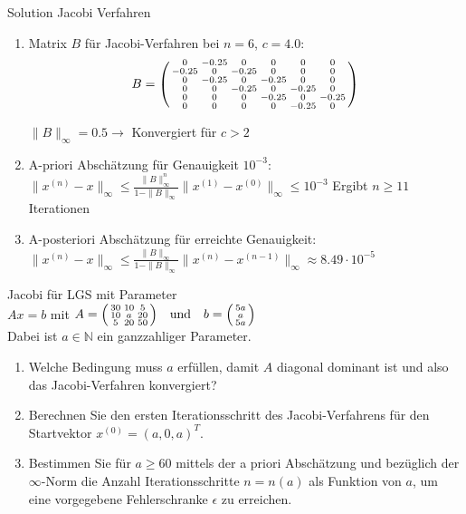 \begin{KR}{Solution Jacobi Verfahren}
\begin{enumerate}
    \item Matrix $B$ für Jacobi-Verfahren bei $n=6$, $c=4.0$:
    $$B = \begin{psmallmatrix}
    0 & -0.25 & 0 & 0 & 0 & 0\\
    -0.25 & 0 & -0.25 & 0 & 0 & 0\\
    0 & -0.25 & 0 & -0.25 & 0 & 0\\
    0 & 0 & -0.25 & 0 & -0.25 & 0\\
    0 & 0 & 0 & -0.25 & 0 & -0.25\\
    0 & 0 & 0 & 0 & -0.25 & 0
    \end{psmallmatrix}$$
    
    $\|B\|_\infty = 0.5 \rightarrow$
    Konvergiert für $c > 2$
    
    \item A-priori Abschätzung für Genauigkeit $10^{-3}$:\\
    $\|x^{(n)} - x\|_\infty \leq \frac{\|B\|_\infty^n}{1-\|B\|_\infty}\|x^{(1)}-x^{(0)}\|_\infty \leq 10^{-3}$
    Ergibt $n \geq 11$ Iterationen
    
    \item A-posteriori Abschätzung für erreichte Genauigkeit:\\
    $\|x^{(n)} - x\|_\infty \leq \frac{\|B\|_\infty}{1-\|B\|_\infty}\|x^{(n)}-x^{(n-1)}\|_\infty \approx 8.49 \cdot 10^{-5}$
\end{enumerate}
\end{KR}

\begin{example2}{Jacobi für LGS mit Parameter}\\
$Ax = b$ mit
$A = \begin{psmallmatrix}
30 & 10 & 5\\
10 & a & 20\\
5 & 20 & 50
\end{psmallmatrix}
\quad \text{und} \quad
b = \begin{psmallmatrix}
5a\\
a\\
5a
\end{psmallmatrix}$\\
Dabei ist $a \in \mathbb{N}$ ein ganzzahliger Parameter.
\begin{enumerate}
    \item Welche Bedingung muss $a$ erfüllen, damit $A$ diagonal dominant ist und also das Jacobi-Verfahren konvergiert?
    
    \item Berechnen Sie den ersten Iterationsschritt des Jacobi-Verfahrens für den Startvektor $x^{(0)} = (a,0,a)^T$.
    
    \item Bestimmen Sie für $a \geq 60$ mittels der a priori Abschätzung und bezüglich der $\infty$-Norm die Anzahl Iterationsschritte $n = n(a)$ als Funktion von $a$, um eine vorgegebene Fehlerschranke $\epsilon$ zu erreichen.
\end{enumerate}
\end{example2}

